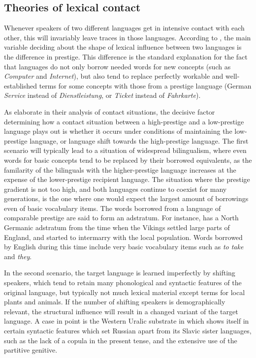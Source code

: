 \subsection{Theories of lexical contact}
Whenever speakers of two different languages get in intensive contact with each other, this will invariably leave traces in those languages. According to \citet[Section 8.5]{hock_joseph_1996}, the main variable deciding about the shape of lexical influence between two languages is the difference in prestige. This difference is the standard explanation for the fact that languages do not only borrow needed words for new concepts (such as  \textit{Computer} and \textit{Internet}), but also tend to replace perfectly workable and well-established terms for some concepts with those from a prestige language (German \textit{Service} instead of \textit{Dienstleistung}, or \textit{Ticket} instead of \textit{Fahrkarte}).

As \citet{thomason_kaufman_1988} elaborate in their analysis of contact situations, the decisive factor determining how a contact situation between a high-prestige and a low-prestige language plays out is whether it occurs under conditions of maintaining the low-prestige language, or language shift towards the high-prestige language. The first scenario will typically lead to a situation of widespread bilingualism, where even words for basic concepts tend to be replaced by their borrowed equivalents, as the familarity of the bilinguals with the higher-prestige language increases at the expense of the lower-prestige recipient language. The situation where the prestige gradient is not too high, and both languages continue to coexist for many generations, is the one where one would expect the largest amount of borrowings even of basic vocabulary items. The words borrowed from a language of comparable prestige are said to form an adstratum. For instance,  has a North Germanic 
adstratum from the time when the Vikings settled large parts of England, and started to intermarry with the local population. Words borrowed by English during this time include very basic vocabulary items such as \textit{to take} and \textit{they}.

In the second scenario, the target language is learned imperfectly by shifting speakers, which tend to retain many phonological and syntactic features of the original language, but typically not much lexical material except terms for local plants and animals. If the number of shifting speakers is demographically relevant, the structural  influence will result in a changed variant of the target language. A case in point is the Western Uralic substrate in  which shows itself in certain syntactic features which set Russian apart from its Slavic sister languages, such as the lack of a copula in the present tense, and the extensive use of the partitive genitive.

